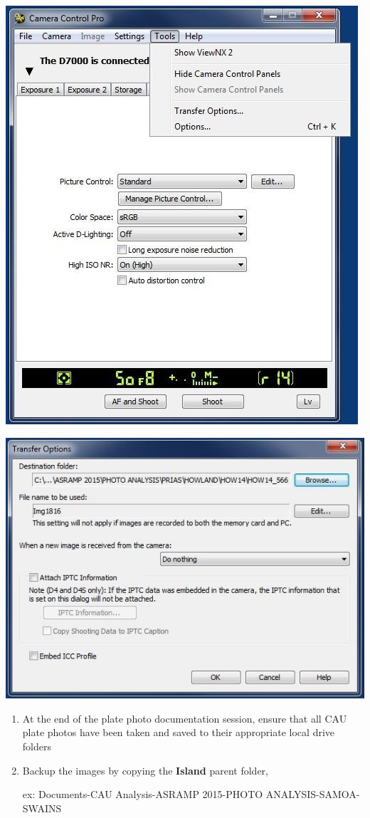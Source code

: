 \documentclass[]{book}
\begin{document}
\includegraphics{images/Camera16.jpg}

\includegraphics{images/Camera17.jpg}

\begin{enumerate}
\def\labelenumi{\arabic{enumi}.}
\setcounter{enumi}{16}
\item
  At the end of the plate photo documentation session, ensure that all CAU plate photos have been taken and saved to their appropriate local drive folders
\item
  Backup the images by copying the \textbf{Island} parent folder,

  ex: Documents-CAU Analysis-ASRAMP 2015-PHOTO ANALYSIS-SAMOA-SWAINS
\end{enumerate}
\end{document}
